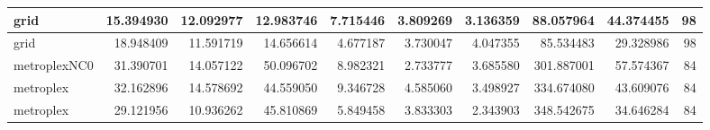 \begin{longtable}{|l|r|r|r|r|r|r|r|r|r|}
grid & 15.394930 & 12.092977 & 12.983746 & 7.715446 & 3.809269 & 3.136359 & 88.057964 & 44.374455 & 98 \\ \hline
grid & 18.948409 & 11.591719 & 14.656614 & 4.677187 & 3.730047 & 4.047355 & 85.534483 & 29.328986 & 98 \\ \hline
metroplexNC0 & 31.390701 & 14.057122 & 50.096702 & 8.982321 & 2.733777 & 3.685580 & 301.887001 & 57.574367 & 84 \\ \hline
metroplex & 32.162896 & 14.578692 & 44.559050 & 9.346728 & 4.585060 & 3.498927 & 334.674080 & 43.609076 & 84 \\ \hline
metroplex & 29.121956 & 10.936262 & 45.810869 & 5.849458 & 3.833303 & 2.343903 & 348.542675 & 34.646284 & 84 \\ \hline
\end{longtable}
